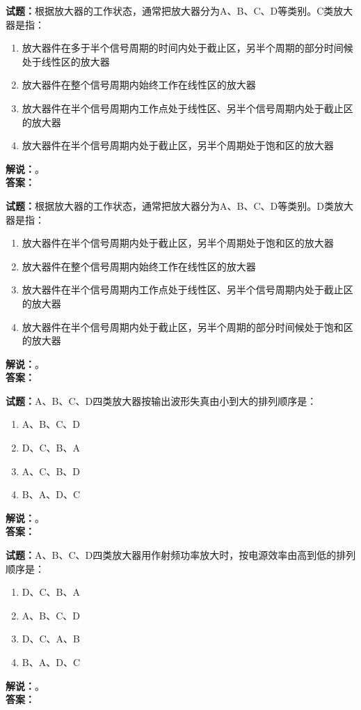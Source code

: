 \documentclass{ctexbook}
\begin{document}
\bigskip

\noindent\textbf{试题：}根据放大器的工作状态，通常把放大器分为A、B、C、D等类别。C类放大器是指：
\begin{enumerate}[leftmargin=3em]
  \item 放大器件在多于半个信号周期的时间内处于截止区，另半个周期的部分时间候处于线性区的放大器
  \item 放大器件在整个信号周期内始终工作在线性区的放大器
  \item 放大器件在半个信号周期内工作点处于线性区、另半个信号周期内处于截止区的放大器
  \item 放大器件在半个信号周期内处于截止区，另半个周期处于饱和区的放大器
\end{enumerate}
\noindent\textbf{解说：}\textbf{}。\\\noindent\textbf{答案：}

\bigskip

\noindent\textbf{试题：}根据放大器的工作状态，通常把放大器分为A、B、C、D等类别。D类放大器是指：
\begin{enumerate}[leftmargin=3em]
  \item 放大器件在半个信号周期内处于截止区，另半个周期处于饱和区的放大器
  \item 放大器件在整个信号周期内始终工作在线性区的放大器
  \item 放大器件在半个信号周期内工作点处于线性区、另半个信号周期内处于截止区的放大器
  \item 放大器件在半个信号周期内处于截止区，另半个周期的部分时间候处于饱和区的放大器
\end{enumerate}
\noindent\textbf{解说：}\textbf{}。\\\noindent\textbf{答案：}

\bigskip

\noindent\textbf{试题：}A、B、C、D四类放大器按输出波形失真由小到大的排列顺序是：
\begin{enumerate}[leftmargin=3em]
  \item A、B、C、D
  \item D、C、B、A
  \item A、C、B、D
  \item B、A、D、C
\end{enumerate}
\noindent\textbf{解说：}\textbf{}。\\\noindent\textbf{答案：}

\bigskip

\noindent\textbf{试题：}A、B、C、D四类放大器用作射频功率放大时，按电源效率由高到低的排列顺序是：
\begin{enumerate}[leftmargin=3em]
  \item D、C、B、A
  \item A、B、C、D
  \item D、C、A、B
  \item B、A、D、C
\end{enumerate}
\noindent\textbf{解说：}\textbf{}。\\\noindent\textbf{答案：}
\end{document}
